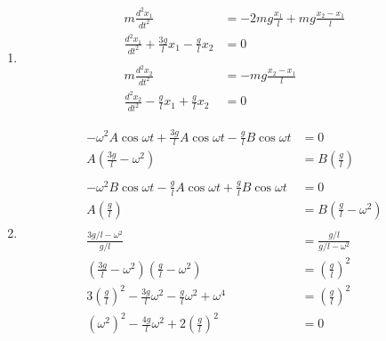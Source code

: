 \documentclass{article}
\begin{document}
\subsection{}

\begin{enumerate}
  \item

        \begin{align*}
          m \frac{d^2 x_1}{d t^2}                                     & = -2 m g \frac{x_1}{l} + m g \frac{x_2 - x_1}{l} \\
          \frac{d^2 x_1}{d t^2} + \frac{3 g}{l} x_1 - \frac{g}{l} x_2 & = 0                                              \\ \\
          m \frac{d^2 x_2}{d t^2}                                     & = -m g \frac{x_2 - x_1}{l}                       \\
          \frac{d^2 x_2}{d t^2} - \frac{g}{l} x_1 + \frac{g}{l} x_2   & = 0
        \end{align*}

  \item

        \begin{align*}
          -\omega^2 A \cos \omega t + \frac{3 g}{l} A \cos \omega t - \frac{g}{l} B \cos \omega t   & = 0                                       \\
          A \left( \frac{3 g}{l} - \omega^2 \right)                                                 & = B \left( \frac{g}{l} \right)            \\ \\
          -\omega^2 B \cos \omega t - \frac{g}{l} A \cos \omega t + \frac{g}{l} B \cos \omega t     & = 0                                       \\
          A \left( \frac{g}{l} \right)                                                              & = B \left( \frac{g}{l} - \omega^2 \right) \\ \\
          \frac{3 g / l - \omega^2}{g / l}                                                          & = \frac{g / l}{g / l - \omega^2}          \\
          \left( \frac{3 g}{l} - \omega^2 \right) \left( \frac{g}{l} - \omega^2 \right)             & = \left( \frac{g}{l} \right)^2            \\
          3 \left( \frac{g}{l} \right)^2 - \frac{3 g}{l} \omega^2 - \frac{g}{l} \omega^2 + \omega^4 & = \left( \frac{g}{l} \right)^2            \\
          (\omega^2)^2 - \frac{4 g}{l} \omega^2 + 2 \left( \frac{g}{l} \right)^2                    & = 0                                       \\
        \end{align*}


\end{enumerate}
\end{document}
